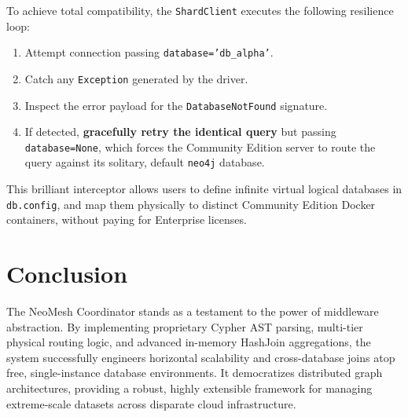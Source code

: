 \documentclass{article}
\begin{document}
To achieve total compatibility, the \texttt{ShardClient} executes the following resilience loop:
\begin{enumerate}
    \item Attempt connection passing \texttt{database='db\_alpha'}.
    \item Catch any \texttt{Exception} generated by the driver.
    \item Inspect the error payload for the \texttt{DatabaseNotFound} signature.
    \item If detected, \textbf{gracefully retry the identical query} but passing \texttt{database=None}, which forces the Community Edition server to route the query against its solitary, default \texttt{neo4j} database.
\end{enumerate}
This brilliant interceptor allows users to define infinite virtual logical databases in \texttt{db.config}, and map them physically to distinct Community Edition Docker containers, without paying for Enterprise licenses.

\section{Conclusion}
The NeoMesh Coordinator stands as a testament to the power of middleware abstraction. By implementing proprietary Cypher AST parsing, multi-tier physical routing logic, and advanced in-memory HashJoin aggregations, the system successfully engineers horizontal scalability and cross-database joins atop free, single-instance database environments. It democratizes distributed graph architectures, providing a robust, highly extensible framework for managing extreme-scale datasets across disparate cloud infrastructure.
\end{document}
